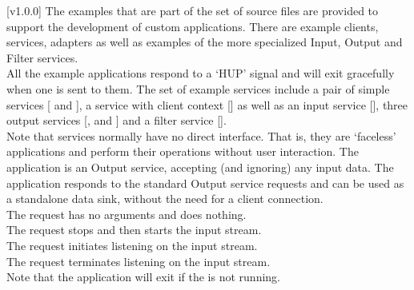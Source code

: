 [v1.0.0]
The examples that are part of the \mplusm{} set of source files are provided to support
the development of custom applications.
There are example clients, services, adapters as well as examples of the more specialized
Input, Output and Filter services.\\

All the example applications respond to a `HUP' signal and will exit gracefully when one
is sent to them.
The set of example services include a pair of simple services
[ and
], a service with client context
[] as well as an input service
[], three output services
[,
 and
] and a filter service
[].\\

Note that services normally have no direct interface.
That is, they are `faceless' applications and perform their operations without user
interaction.
The  application is an Output
service, accepting (and ignoring) any input data.
The application responds to the standard Output service requests and can be used as a
standalone data sink, without the need for a client connection.\\

The  request has no arguments and
does nothing.\\

The  request stops and then
starts the input stream.\\

The  request initiates listening
on the input stream.\\

The  request terminates listening
on the input stream.\\

Note that the application will exit if the
 is not running.\\

